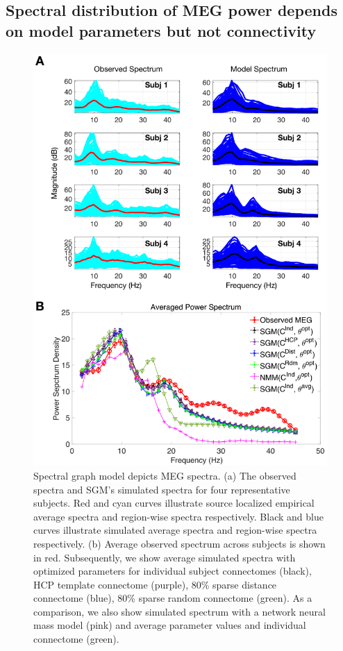 \subsection{Spectral distribution of MEG power depends on model parameters but not
connectivity}

\begin{figure}[htbp]
    \centering
    \includegraphics[scale=0.85]{../figures/chapter5/fig3_spectra_fit.png}
    \caption{Spectral graph model depicts MEG spectra. (a) The observed spectra and SGM's simulated spectra for four representative subjects. Red and cyan curves illustrate source localized empirical average spectra and region-wise spectra respectively. Black and blue curves illustrate simulated average spectra and region-wise spectra respectively. (b) Average observed spectrum across subjects is shown in red. Subsequently, we show average simulated spectra with optimized parameters for individual subject connectomes (black), HCP template connectome (purple), 80\% sparse distance connectome (blue), 80\% sparse random connectome (green). As a comparison, we also show simulated spectrum with a network neural mass model (pink) and average parameter values and individual connectome (green).}
    \label{fig:spectra_fit}
\end{figure}

